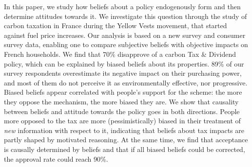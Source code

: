 \documentclass[11pt]{article}
\begin{document}

In this paper, we study how beliefs about a policy endogenously form and then determine attitudes towards it. We investigate this question through the study of carbon taxation in France during the Yellow Vests movement, that started against fuel price increases. Our analysis is based on a new survey and consumer survey data, enabling one to compare subjective beliefs with objective impacts on French households. We find that 70\% disapprove of a carbon Tax \& Dividend policy, which can be explained by biased beliefs about its properties. 89\% of our survey respondents overestimate its negative impact on their purchasing power, and most of them do not perceive it as environmentally effective, nor progressive. Biased beliefs appear correlated with people’s support for the scheme: the more they oppose the mechanism, the more biased they are. We show that causality between beliefs and attitude towards the policy goes in both directions. People more opposed to the tax are more (pessimistically) biased in their treatment of \textit{new} information with respect to it, indicating that beliefs about tax impacts are partly shaped by motivated reasoning. At the same time, we find that acceptance is causally determined by beliefs and that if all biased beliefs could be corrected, the approval rate could reach 90\%.
\end{document}
